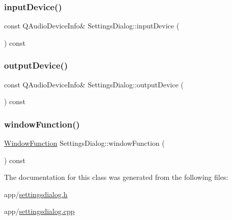 \subsubsection{\texorpdfstring{input\+Device()}{inputDevice()}}
{\footnotesize\ttfamily const Q\+Audio\+Device\+Info\& Settings\+Dialog\+::input\+Device (\begin{DoxyParamCaption}{ }\end{DoxyParamCaption}) const\hspace{0.3cm}{\ttfamily [inline]}}

\hypertarget{class_settings_dialog_afa48fa56f44b1e81def1ef936a35ed2f}{}\label{class_settings_dialog_afa48fa56f44b1e81def1ef936a35ed2f} 
\subsubsection{\texorpdfstring{output\+Device()}{outputDevice()}}
{\footnotesize\ttfamily const Q\+Audio\+Device\+Info\& Settings\+Dialog\+::output\+Device (\begin{DoxyParamCaption}{ }\end{DoxyParamCaption}) const\hspace{0.3cm}{\ttfamily [inline]}}

\hypertarget{class_settings_dialog_a6cd9e3f301ccfa292d4205b20944aae0}{}\label{class_settings_dialog_a6cd9e3f301ccfa292d4205b20944aae0} 
\subsubsection{\texorpdfstring{window\+Function()}{windowFunction()}}
{\footnotesize\ttfamily \hyperlink{spectrum_8h_adae4545e1609513867a86cc5e91fc1d4}{Window\+Function} Settings\+Dialog\+::window\+Function (\begin{DoxyParamCaption}{ }\end{DoxyParamCaption}) const\hspace{0.3cm}{\ttfamily [inline]}}



The documentation for this class was generated from the following files\+:\begin{DoxyCompactItemize}
\item 
app/\hyperlink{settingsdialog_8h}{settingsdialog.\+h}\item 
app/\hyperlink{settingsdialog_8cpp}{settingsdialog.\+cpp}\end{DoxyCompactItemize}
